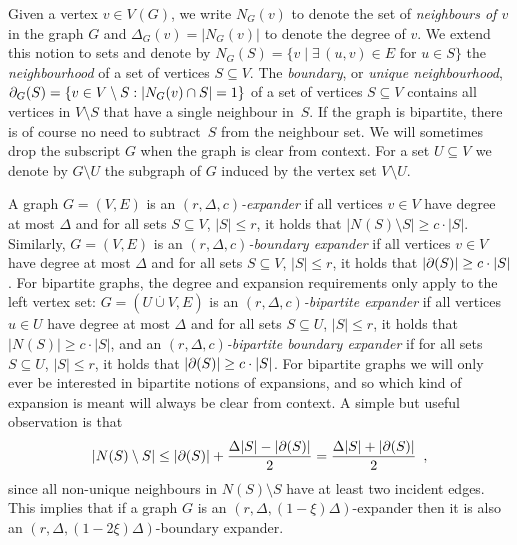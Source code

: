 \documentclass{article}
\newcommand{\boundary}[1]{\ensuremath{\partial #1}}
\newcommand{\set}[1]{\{ #1 \}}
\newcommand{\setdescr}[3][\mid]{\set{ #2 #1 #3 }}
\newcommand{\setsize}[1]{\lvert#1\rvert}
\newcommand{\intersection}{\cap}
\newcommand{\disjointunion}{\overset{.}{\cup}}
\newcommand{\introduceterm}[1]{{\emph{#1}}}
\newcommand{\eqcomma}{\enspace ,}
\newcommand{\neigh}[2][]{N_{{#1}}(#2)}
\newcommand{\uniqueNeigh}[2][]{\boundary_{{#1}} ({#2})}
\renewcommand{\deg}[2][XXXXXXXXXXXX]{\Delta_{#1}(#2)}
\newcommand{\diff}{\xi}
\newcommand{\GdegMax}{\Delta}
\newcommand{\gdegmax}{\GdegMax}
\newcommand{\V}[1][]{V_{#1}}
\numberwithin{equation}{section}
\begin{document}
Given a vertex $v \in \V(G)$,
we write 
$\neigh[G]{v}$
to denote the set of \emph{neighbours of $v$} in the graph $G$
and $\deg[G]{v} = \setsize{\neigh[G]{v}}$ to denote the degree of $v$.
We extend this notion to sets and denote by 
$\neigh[G]{S} = \setdescr{v}{\exists\, (u,v)\in E \text { for } u\in S}$ 
the \emph{neighbourhood}
of a set of vertices $S \subseteq V$.
The \emph{boundary}, 
or \emph{unique  neighbourhood},
$\uniqueNeigh[G]{S}
=
\setdescr[:]
{v \in V \setminus S}
{\setsize{\neigh[G]{v} \intersection S} = 1}
$
of a set of vertices
$S \subseteq V$ 
contains all vertices in
$V \setminus  S$ that have a single neighbour 
in~$S$.
  If the graph is bipartite, there is of course  no need to
  subtract~$S$ from the neighbour set.
We will sometimes drop the subscript $G$ when the graph is clear from
context.
For a set $U \subseteq \V$ we
denote by $G\setminus U$ the subgraph of $G$ induced by the vertex set
$\V \setminus U$.  

A graph $G = (V, E)$ is an
\introduceterm{$(r, \gdegmax, c)$-expander} 
if all vertices $v \in V$ have degree at most $\gdegmax$ and for all
sets $S \subseteq V$, $\setsize{S} \le r$, it holds that
$\setsize{ \neigh{S} \setminus S } \geq c \cdot \setsize{S}$.
Similarly,
$G = (V, E)$
is an \emph{$(r, \gdegmax, c)$-boundary expander} if all vertices 
$v \in V$ 
have degree at most $\gdegmax$ and for all sets  
$S \subseteq V$,  $\setsize{S} \leq r$,
it holds that $\setsize{ \uniqueNeigh{S} } \geq c \cdot \setsize{S}$. 
For bipartite graphs, 
the degree and expansion requirements only apply to the left vertex set:
$G = (U \disjointunion V, E)$
is an
\introduceterm{$(r, \gdegmax, c)$-bipartite expander} 
if all vertices 
$u \in U$ 
have degree at most $\gdegmax$ and for all sets  
$S \subseteq U$,  $\setsize{S} \leq r$,
it holds that $\setsize{ \neigh{S} } \geq c \cdot \setsize{S}$,
and an
\emph{$(r, \gdegmax, c)$-bipartite boundary expander} if 
for all sets  
$S \subseteq U$,  $\setsize{S} \leq r$,
it holds that $\setsize{ \uniqueNeigh{S} } \geq c \cdot \setsize{S}$. 
For bipartite graphs we will only ever be interested in bipartite
notions of expansions, and so which kind of expansion is meant will
always be clear from context.
A simple
but useful observation is that
\begin{equation}
  \label{eq:neighbour-leq-unique}
  \setsize{ N(S) \setminus S } \le 
  \setsize{ \uniqueNeigh{S}}  + 
  \frac{\GdegMax \setsize{ S } - \setsize{ \uniqueNeigh{S} }}{2}
  = \frac{\GdegMax \setsize{ S } + \setsize{ \uniqueNeigh{S} }}{2}
  \eqcomma
\end{equation}
since all non-unique neighbours in $N(S) \setminus S$ have at least two incident edges.
This implies that if a graph $G$ is an 
\mbox{$(r, \gdegmax, (1-\diff)\gdegmax)$}-expander then it 
is
also
an $(r, \gdegmax, (1-2\diff)\gdegmax)$-boundary expander.
\end{document}
